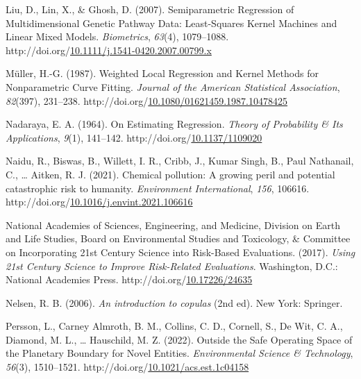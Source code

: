 \documentclass[12pt, twoside]{amherstthesis}
\newenvironment{CSLReferences}[2]%
  {}%
  {\par}
\begin{document}
\begin{CSLReferences}{1}{0}
\leavevmode{}%
Liu, D., Lin, X., \& Ghosh, D. (2007). Semiparametric {Regression} of {Multidimensional} {Genetic} {Pathway} {Data}: {Least}-{Squares} {Kernel} {Machines} and {Linear} {Mixed} {Models}. \emph{Biometrics}, \emph{63}(4), 1079--1088. http://doi.org/\href{https://doi.org/10.1111/j.1541-0420.2007.00799.x}{10.1111/j.1541-0420.2007.00799.x}

\leavevmode{}%
Müller, H.-G. (1987). Weighted {Local} {Regression} and {Kernel} {Methods} for {Nonparametric} {Curve} {Fitting}. \emph{Journal of the American Statistical Association}, \emph{82}(397), 231--238. http://doi.org/\href{https://doi.org/10.1080/01621459.1987.10478425}{10.1080/01621459.1987.10478425}

\leavevmode{}%
Nadaraya, E. A. (1964). On {Estimating} {Regression}. \emph{Theory of Probability \& Its Applications}, \emph{9}(1), 141--142. http://doi.org/\href{https://doi.org/10.1137/1109020}{10.1137/1109020}

\leavevmode{}%
Naidu, R., Biswas, B., Willett, I. R., Cribb, J., Kumar Singh, B., Paul Nathanail, C., \ldots{} Aitken, R. J. (2021). Chemical pollution: {A} growing peril and potential catastrophic risk to humanity. \emph{Environment International}, \emph{156}, 106616. http://doi.org/\href{https://doi.org/10.1016/j.envint.2021.106616}{10.1016/j.envint.2021.106616}

\leavevmode{}%
National Academies of Sciences, Engineering, and Medicine, Division on Earth and Life Studies, Board on Environmental Studies and Toxicology, \& Committee on Incorporating 21st Century Science into Risk-Based Evaluations. (2017). \emph{Using 21st {Century} {Science} to {Improve} {Risk}-{Related} {Evaluations}}. Washington, D.C.: National Academies Press. http://doi.org/\href{https://doi.org/10.17226/24635}{10.17226/24635}

\leavevmode{}%
Nelsen, R. B. (2006). \emph{An introduction to copulas} (2nd ed). New York: Springer.

\leavevmode{}%
Persson, L., Carney Almroth, B. M., Collins, C. D., Cornell, S., De Wit, C. A., Diamond, M. L., \ldots{} Hauschild, M. Z. (2022). Outside the {Safe} {Operating} {Space} of the {Planetary} {Boundary} for {Novel} {Entities}. \emph{Environmental Science \& Technology}, \emph{56}(3), 1510--1521. http://doi.org/\href{https://doi.org/10.1021/acs.est.1c04158}{10.1021/acs.est.1c04158}


\end{CSLReferences}
\end{document}
